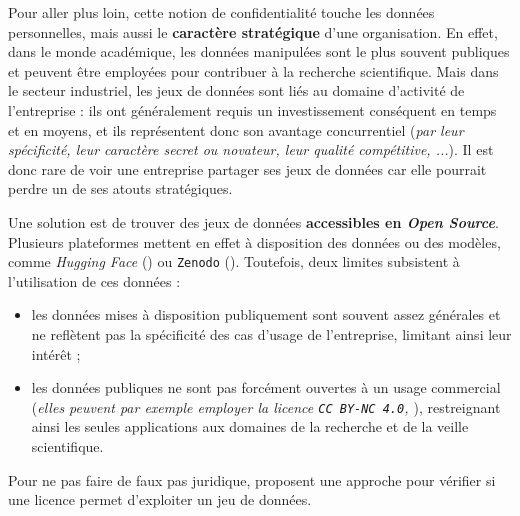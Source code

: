 			Pour aller plus loin, cette notion de confidentialité touche les données personnelles, mais aussi le \textbf{caractère stratégique} d'une organisation.
			En effet, dans le monde académique, les données manipulées sont le plus souvent publiques et peuvent être employées pour contribuer à la recherche scientifique.
			Mais dans le secteur industriel, les jeux de données sont liés au domaine d'activité de l'entreprise : ils ont généralement requis un investissement conséquent en temps et en moyens, et ils représentent donc son avantage concurrentiel (\textit{par leur spécificité, leur caractère secret ou novateur, leur qualité compétitive, ...}).
			Il est donc rare de voir une entreprise partager ses jeux de données car elle pourrait perdre un de ses atouts stratégiques.
			
			Une solution est de trouver des jeux de données \textbf{accessibles en \textit{Open Source}}.
			Plusieurs plateformes mettent en effet à disposition des données ou des modèles, comme \textit{Hugging Face} (\cite{hugging-face:2016:hugging-face-ai}) ou \texttt{Zenodo} (\cite{re3data.org:2013:zenodo}).
			Toutefois, deux limites subsistent à l'utilisation de ces données :
			\begin{itemize}
				\item les données mises à disposition publiquement sont souvent assez générales et ne reflètent pas la spécificité des cas d'usage de l'entreprise, limitant ainsi leur intérêt ;
				\item les données publiques ne sont pas forcément ouvertes à un usage commercial (\textit{elles peuvent par exemple employer la licence \texttt{CC BY-NC 4.0}, \cite{creative-commons:2013:cc-bync-legal}}), restreignant ainsi les seules applications aux domaines de la recherche et de la veille scientifique.
			\end{itemize}
			Pour ne pas faire de faux pas juridique, \cite{rajbahadur-etal:2022:can-use-this} proposent une approche pour vérifier si une licence permet d'exploiter un jeu de données.
			
